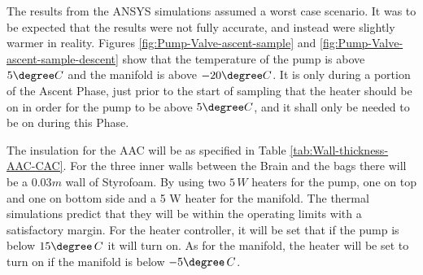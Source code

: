 The results from the ANSYS simulations assumed a worst case scenario. It was to be expected that the results were not fully accurate, and instead were slightly warmer in reality. Figures \ref{fig:Pump-Valve-ascent-sample} and \ref{fig:Pump-Valve-ascent-sample-descent} show that the temperature of the pump is above $5\degree C$ and the manifold is above $-20\degree C$. It is only during a portion of the Ascent Phase, just prior to the start of sampling that the heater should be on in order for the pump to be above $5\degree C$, and it shall only be needed to be on during this Phase.

The insulation for the AAC will be as specified in Table \ref{tab:Wall-thickness-AAC-CAC}. For the three inner walls between the Brain and the bags there will be a $0.03 m$ wall of Styrofoam. By using two $5\,W$ heaters for the pump, one on top and one on bottom side and a 5 W heater for the manifold. The thermal simulations predict that they will be within the operating limits with a satisfactory margin. For the heater controller, it will be set that if the pump is below $15\degree\,C$ it will turn on. As for the manifold, the heater will be set to turn on if the manifold is below $-5 \degree\,C$.
